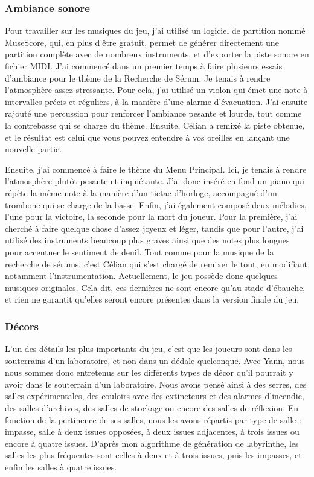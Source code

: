 \documentclass{article}
\begin{document}
\subsubsection{Ambiance sonore}

Pour travailler sur les musiques du jeu, j'ai utilisé un logiciel de partition nommé MuseScore, qui, en plus d'être gratuit, permet de générer directement une partition complète avec de nombreux instruments, et d'exporter la piste sonore en fichier MIDI. J'ai commencé dans un premier temps à faire plusieurs essais d'ambiance pour le thème de la Recherche de Sérum. Je tenais à rendre l'atmosphère assez stressante. Pour cela, j'ai utilisé un violon qui émet une note à intervalles précis et réguliers, à la manière d'une alarme d'évacuation. J'ai ensuite rajouté une percussion pour renforcer l'ambiance pesante et lourde, tout comme la contrebasse qui se charge du thème. Ensuite, Célian a remixé la piste obtenue, et le résultat est celui que vous pouvez entendre à vos oreilles en lançant une nouvelle partie.

Ensuite, j'ai commencé à faire le thème du Menu Principal. Ici, je tenais à rendre l'atmosphère plutôt pesante et inquiétante. J'ai donc inséré en fond un piano qui répète la même note à la manière d'un tictac d'horloge, accompagné d'un trombone qui se charge de la basse. Enfin, j'ai également composé deux mélodies, l'une pour la victoire, la seconde pour la mort du joueur. Pour la première, j'ai cherché à faire quelque chose d'assez joyeux et léger, tandis que pour l'autre, j'ai utilisé des instruments beaucoup plus graves ainsi que des notes plus longues pour accentuer le sentiment de deuil. Tout comme pour la musique de la recherche de sérums, c'est Célian qui s'est chargé de remixer le tout, en modifiant notamment l'instrumentation. Actuellement, le jeu possède donc quelques musiques originales. Cela dit, ces dernières ne sont encore qu'au stade d'ébauche, et rien ne garantit qu'elles seront encore présentes dans la version finale du jeu.

\subsubsection{Décors}

L'un des détails les plus importants du jeu, c'est que les joueurs sont dans les souterrains d'un laboratoire, et non dans un dédale quelconque. Avec Yann, nous nous sommes donc entretenus sur les différents types de décor qu'il pourrait y avoir dans le souterrain d'un laboratoire. Nous avons pensé ainsi à des serres, des salles expérimentales, des couloirs avec des extincteurs et des alarmes d'incendie, des salles d'archives, des salles de stockage ou encore des salles de réflexion. En fonction de la pertinence de ses salles, nous les avons répartis par type de salle : impasse, salle à deux issues opposées, à deux issues adjacentes, à trois issues ou encore à quatre issues. D'après mon algorithme de génération de labyrinthe, les salles les plus fréquentes sont celles à deux et à trois issues, puis les impasses, et enfin les salles à quatre issues.
\end{document}
